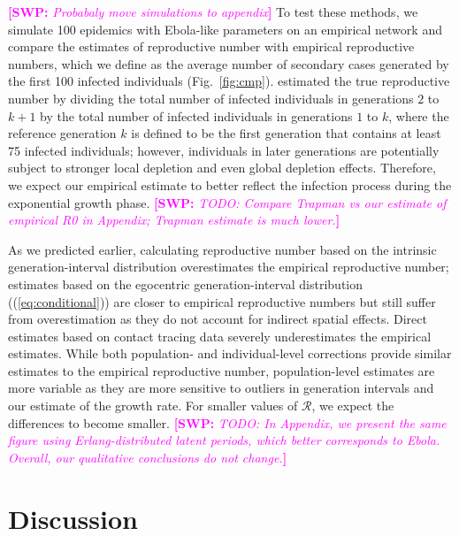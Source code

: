 \documentclass[12pt]{article}
\newcommand{\eref}[1]{(\ref{eq:#1})}
\newcommand{\fref}[1]{Fig.~\ref{fig:#1}}
\newcommand{\RR}{\ensuremath{{\mathcal R}}}
\newcommand{\comment}[3]{\textcolor{#1}{\textbf{[#2: }\textsl{#3}\textbf{]}}}
\newcommand{\swp}[1]{\comment{magenta}{SWP}{#1}}
\begin{document}
\swp{Probabaly move simulations to appendix}
To test these methods, we simulate 100 epidemics with Ebola-like parameters on an empirical network and compare the estimates of reproductive number with empirical reproductive numbers, which we define as the average number of secondary cases generated by the first 100 infected individuals (\fref{cmp}).
\cite{trapman2016inferring} estimated the true reproductive number by dividing the total number of infected individuals in generations $2$ to $k+1$ by the total number of infected individuals in generations $1$ to $k$, where the reference generation $k$ is defined to be the first generation that contains at least 75 infected individuals;
however, individuals in later generations are potentially subject to stronger local depletion and even global depletion effects.
Therefore, we expect our empirical estimate to better reflect the infection process during the exponential growth phase.
\swp{TODO: Compare Trapman vs our estimate of empirical R0 in Appendix; Trapman estimate is much lower.}

As we predicted earlier, calculating reproductive number based on the intrinsic generation-interval distribution overestimates the empirical reproductive number;
estimates based on the egocentric generation-interval distribution (\eref{conditional}) are closer to empirical reproductive numbers but still suffer from overestimation as they do not account for indirect spatial effects.
Direct estimates based on contact tracing data severely underestimates the empirical estimates.
While both population- and individual-level corrections provide similar estimates to the empirical reproductive number,
population-level estimates are more variable as they are more sensitive to outliers in generation intervals and our estimate of the growth rate.
For smaller values of \RR, we expect the differences to become smaller. 
\swp{TODO: In Appendix, we present the same figure using Erlang-distributed latent periods, which better corresponds to Ebola. Overall, our qualitative conclusions do not change.}

\section{Discussion}
\end{document}

